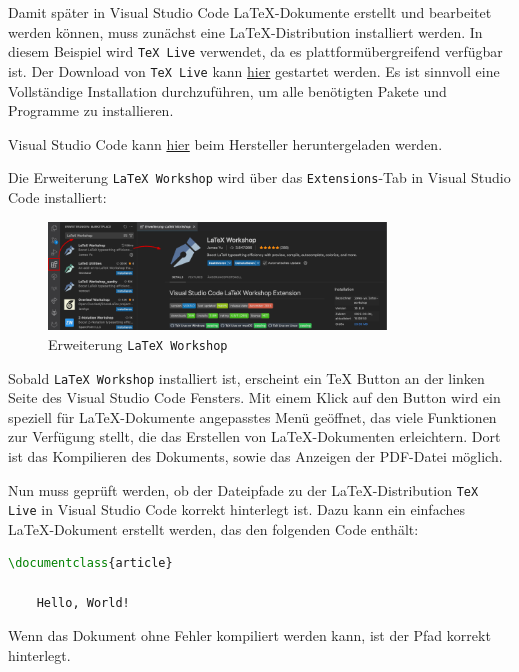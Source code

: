 Damit später in Visual Studio Code \LaTeX{}-Dokumente erstellt und bearbeitet werden können, muss zunächst eine \LaTeX{}-Distribution installiert werden. In diesem Beispiel wird \texttt{TeX Live} verwendet, da es plattformübergreifend verfügbar ist. Der Download von \texttt{TeX Live} kann \href{https://www.tug.org/texlive/}{hier} gestartet werden. Es ist sinnvoll eine Vollständige Installation durchzuführen, um alle benötigten Pakete und Programme zu installieren.

Visual Studio Code kann \href{https://code.visualstudio.com/Download}{hier} beim Hersteller heruntergeladen werden.

Die Erweiterung \texttt{LaTeX Workshop} wird über das \texttt{Extensions}-Tab in Visual Studio Code installiert:

\begin{figure}[H]
    \centering
    \includegraphics[width=0.8\textwidth]{anlagen/bilder/Latex_Workshop_Ext.pdf}
    \caption{Erweiterung \texttt{LaTeX Workshop}}
    \label{fig:visual_studio_code_latex_workshop}
\end{figure}

Sobald \texttt{LaTeX Workshop} installiert ist, erscheint ein \TeX{} Button an der linken Seite des Visual Studio Code Fensters. Mit einem Klick auf den Button wird ein speziell für \LaTeX{}-Dokumente angepasstes Menü geöffnet, das viele Funktionen zur Verfügung stellt, die das Erstellen von \LaTeX{}-Dokumenten erleichtern. Dort ist das Kompilieren des Dokuments, sowie das Anzeigen der PDF-Datei möglich.

Nun muss geprüft werden, ob der Dateipfade zu der \LaTeX{}-Distribution \texttt{TeX Live} in Visual Studio Code korrekt hinterlegt ist.
Dazu kann ein einfaches \LaTeX{}-Dokument erstellt werden, das den folgenden Code enthält:

\begin{minipage}{0.5\textwidth}
    \begin{lstlisting}[language=TeX, emph={documentclass, begin}, emphstyle={\color{blue}}]
\documentclass{article}

    Hello, World!

    \end{lstlisting}
\end{minipage}
\hfill
\parbox[b]{0.45\textwidth}{Wenn das Dokument ohne Fehler kompiliert werden kann, ist der Pfad korrekt hinterlegt.}

